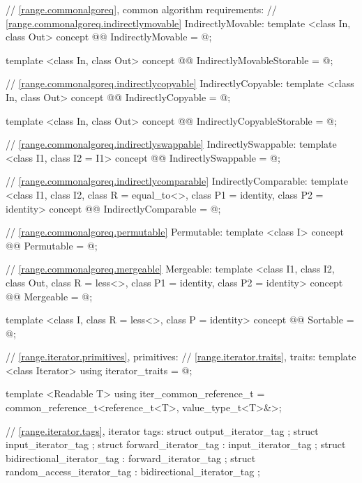 {\begin{codeblock}
{{    // \ref{range.commonalgoreq}, common algorithm requirements:
    // \ref{range.commonalgoreq.indirectlymovable} IndirectlyMovable:
    template <class In, class Out>
    concept @@ IndirectlyMovable = @\seebelow@;

    template <class In, class Out>
    concept @@ IndirectlyMovableStorable = @\seebelow@;

    // \ref{range.commonalgoreq.indirectlycopyable} IndirectlyCopyable:
    template <class In, class Out>
    concept @@ IndirectlyCopyable = @\seebelow@;

    template <class In, class Out>
    concept @@ IndirectlyCopyableStorable = @\seebelow@;

    // \ref{range.commonalgoreq.indirectlyswappable} IndirectlySwappable:
    template <class I1, class I2 = I1>
    concept @@ IndirectlySwappable = @\seebelow@;

    // \ref{range.commonalgoreq.indirectlycomparable} IndirectlyComparable:
    template <class I1, class I2, class R = equal_to<>, class P1 = identity,
        class P2 = identity>
    concept @@ IndirectlyComparable = @\seebelow@;

    // \ref{range.commonalgoreq.permutable} Permutable:
    template <class I>
    concept @@ Permutable = @\seebelow@;

    // \ref{range.commonalgoreq.mergeable} Mergeable:
    template <class I1, class I2, class Out,
        class R = less<>, class P1 = identity, class P2 = identity>
    concept @@ Mergeable = @\seebelow@;

    template <class I, class R = less<>, class P = identity>
    concept @@ Sortable = @\seebelow@;

    // \ref{range.iterator.primitives}, primitives:
    // \ref{range.iterator.traits}, traits:
    template <class Iterator> using iterator_traits = @\seebelow@;

    template <Readable T> using iter_common_reference_t
      = common_reference_t<reference_t<T>, value_type_t<T>&>;

    // \ref{range.iterator.tags}, iterator tags:
    struct output_iterator_tag { };
    struct input_iterator_tag { };
    struct forward_iterator_tag : input_iterator_tag { };
    struct bidirectional_iterator_tag : forward_iterator_tag { };
    struct random_access_iterator_tag : bidirectional_iterator_tag { };

}}
\end{codeblock}}
